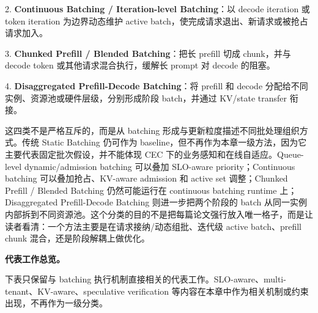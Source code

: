 \documentclass[a4paper,twocolumn,10pt]{ctexart}
\begin{document}
2. \textbf{Continuous Batching / Iteration-level Batching}：以 decode iteration 或 token iteration 为边界动态维护 active batch，使完成请求退出、新请求或被抢占请求加入。


3. \textbf{Chunked Prefill / Blended Batching}：把长 prefill 切成 chunk，并与 decode token 或其他请求混合执行，缓解长 prompt 对 decode 的阻塞。


4. \textbf{Disaggregated Prefill-Decode Batching}：将 prefill 和 decode 分配给不同实例、资源池或硬件层级，分别形成阶段 batch，并通过 KV/state transfer 衔接。


这四类不是严格互斥的，而是从 batching 形成与更新粒度描述不同批处理组织方式。传统 Static Batching 仍可作为 baseline，但不再作为本章一级方法，因为它主要代表固定批次假设，并不能体现 CEC 下的业务感知和在线自适应。Queue-level dynamic/admission batching 可以叠加 SLO-aware priority；Continuous batching 可以叠加抢占、KV-aware admission 和 active set 调整；Chunked Prefill / Blended Batching 仍然可能运行在 continuous batching runtime 上；Disaggregated Prefill-Decode Batching 则进一步把两个阶段的 batch 从同一实例内部拆到不同资源池。这个分类的目的不是把每篇论文强行放入唯一格子，而是让读者看清：一个方法主要是在请求接纳/动态组批、迭代级 active batch、prefill chunk 混合，还是阶段解耦上做优化。


\textbf{代表工作总览。}


下表只保留与 batching 执行机制直接相关的代表工作。SLO-aware、multi-tenant、KV-aware、speculative verification 等内容在本章中作为相关机制或约束出现，不再作为一级分类。
\end{document}

